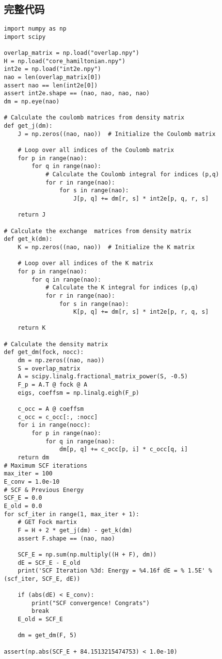 \documentclass[12pt, a4paper, oneside]{ctexart}
\begin{document}
\begin{appendices}
    \renewcommand{\thesection}{\Alph{section}}
    \section{完整代码}
\begin{lstlisting}[style = Python]
import numpy as np
import scipy

overlap_matrix = np.load("overlap.npy")
H = np.load("core_hamiltonian.npy")
int2e = np.load("int2e.npy")
nao = len(overlap_matrix[0])
assert nao == len(int2e[0])
assert int2e.shape == (nao, nao, nao, nao)
dm = np.eye(nao)

# Calculate the coulomb matrices from density matrix
def get_j(dm):
    J = np.zeros((nao, nao))  # Initialize the Coulomb matrix

    # Loop over all indices of the Coulomb matrix
    for p in range(nao):
        for q in range(nao):
            # Calculate the Coulomb integral for indices (p,q)
            for r in range(nao):
                for s in range(nao):
                    J[p, q] += dm[r, s] * int2e[p, q, r, s]

    return J

# Calculate the exchange  matrices from density matrix
def get_k(dm):
    K = np.zeros((nao, nao))  # Initialize the K matrix

    # Loop over all indices of the K matrix
    for p in range(nao):
        for q in range(nao):
            # Calculate the K integral for indices (p,q)
            for r in range(nao):
                for s in range(nao):
                    K[p, q] += dm[r, s] * int2e[p, r, q, s]

    return K

# Calculate the density matrix
def get_dm(fock, nocc):
    dm = np.zeros((nao, nao))
    S = overlap_matrix
    A = scipy.linalg.fractional_matrix_power(S, -0.5)
    F_p = A.T @ fock @ A
    eigs, coeffsm = np.linalg.eigh(F_p)

    c_occ = A @ coeffsm
    c_occ = c_occ[:, :nocc]
    for i in range(nocc):
        for p in range(nao):
            for q in range(nao):
                dm[p, q] += c_occ[p, i] * c_occ[q, i]
    return dm
# Maximum SCF iterations
max_iter = 100
E_conv = 1.0e-10
# SCF & Previous Energy
SCF_E = 0.0
E_old = 0.0
for scf_iter in range(1, max_iter + 1):
    # GET Fock martix
    F = H + 2 * get_j(dm) - get_k(dm)
    assert F.shape == (nao, nao)

    SCF_E = np.sum(np.multiply((H + F), dm))
    dE = SCF_E - E_old
    print('SCF Iteration %3d: Energy = %4.16f dE = % 1.5E' % (scf_iter, SCF_E, dE))

    if (abs(dE) < E_conv):
        print("SCF convergence! Congrats")
        break
    E_old = SCF_E

    dm = get_dm(F, 5)

assert(np.abs(SCF_E + 84.1513215474753) < 1.0e-10)
\end{lstlisting}
\end{appendices}
\end{document}
